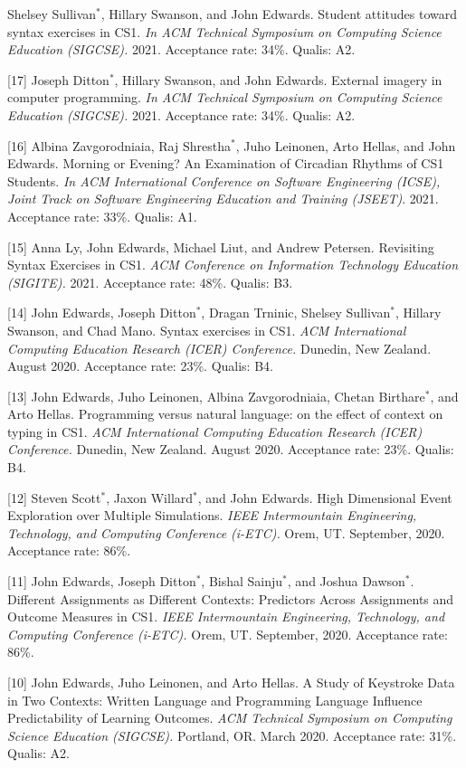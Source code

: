 \documentclass[margin,line]{res}
\newcommand{\pubunder}[1]{#1}
\newcommand{\cnum}[1]{[#1]}
\begin{document}
\begin{resume}
\cnum{18} Shelsey Sullivan$^*$, Hillary Swanson, and John Edwards. Student attitudes toward syntax exercises in CS1. \textit{In ACM Technical Symposium on Computing Science Education (SIGCSE).} 2021. Acceptance rate: 34\%. Qualis: A2.

\cnum{17} Joseph Ditton$^*$, Hillary Swanson, and John Edwards. External imagery in computer programming. \textit{In ACM Technical Symposium on Computing Science Education (SIGCSE).} 2021. Acceptance rate: 34\%. Qualis: A2.

\cnum{16} Albina Zavgorodniaia, Raj Shrestha$^*$, Juho Leinonen, Arto Hellas, and John Edwards. Morning or Evening? An Examination of Circadian Rhythms of CS1 Students. \textit{In ACM International Conference on Software Engineering (ICSE), Joint Track on Software Engineering Education and Training (JSEET)}. 2021. Acceptance rate: 33\%. Qualis: A1.

\cnum{15} Anna Ly, John Edwards, Michael Liut, and Andrew Petersen. Revisiting Syntax Exercises in CS1. \textit{ACM Conference on Information Technology Education (SIGITE).} 2021. Acceptance rate: 48\%. Qualis: B3.

\cnum{14} John Edwards, Joseph Ditton$^*$, Dragan Trninic, Shelsey Sullivan$^*$, Hillary Swanson, and Chad Mano. Syntax exercises in CS1. \textit{ACM International Computing Education Research (ICER) Conference.} Dunedin, New Zealand. August 2020. Acceptance rate: 23\%. Qualis: B4.

\cnum{13} John Edwards, Juho Leinonen, Albina Zavgorodniaia, Chetan Birthare$^*$, and Arto Hellas. Programming versus natural language: on the effect of context on typing in CS1. \textit{ACM International Computing Education Research (ICER) Conference.} Dunedin, New Zealand. August 2020. Acceptance rate: 23\%. Qualis: B4.

\cnum{12} Steven Scott$^*$, Jaxon Willard$^*$, and \pubunder{John Edwards}. High Dimensional Event Exploration over Multiple Simulations. \textit{IEEE Intermountain Engineering, Technology, and Computing Conference (i-ETC).} Orem, UT. September, 2020. Acceptance rate: 86\%.

\cnum{11} John Edwards, Joseph Ditton$^*$, Bishal Sainju$^*$, and Joshua Dawson$^*$. Different Assignments as Different Contexts: Predictors Across Assignments and Outcome Measures in CS1. \textit{IEEE Intermountain Engineering, Technology, and Computing Conference (i-ETC).} Orem, UT. September, 2020. Acceptance rate: 86\%.

\cnum{10} John Edwards, Juho Leinonen, and Arto Hellas. A Study of Keystroke Data in Two Contexts: Written Language and Programming Language Influence Predictability of Learning Outcomes.  \textit{ACM Technical Symposium on Computing Science Education (SIGCSE).} Portland, OR. March 2020.  Acceptance rate: 31\%. Qualis: A2.


\end{resume}
\end{document}
